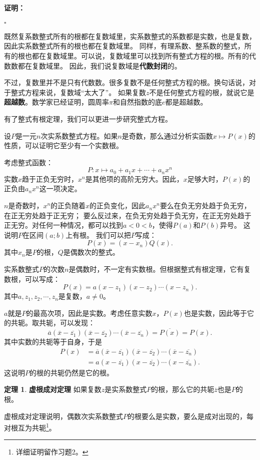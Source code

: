 \documentclass[12pt,UTF8]{ctexbook}
\theoremstyle{definition}
\newtheorem{tm}{定理}[section]
\theoremstyle{plain}
\renewenvironment{proof}{\paragraph{\textbf{证明：}}}{\hfill$\square$}
\begin{document}
\begin{appendix}
\begin{proof}
\end{proof}

既然复系数整式所有的根都在复数域里，实系数整式的系数都是实数，也是复数，因此实系数整式所有的根也都在复数域里。
同样，有理系数、整系数的整式，所有的根也都在复数域里。可以说，复数域里可以找到所有整式方程的根。所有的代数数都在复数域里。
因此，我们说复数域是\textbf{代数封闭}的。

不过，复数里并不是只有代数数。很多复数不是任何整式方程的根。换句话说，对于整式方程来说，复数域“太大了”。
如果复数$z$不是任何整式方程的根，就说它是\textbf{超越数}。数学家已经证明，圆周率$\pi$和自然指数的底$e$都是超越数。

有了整式有根定理，我们可以更进一步研究整式方程。

设$P$是一元$n$次实系数整式方程。如果$n$是奇数，那么通过分析实函数$x\mapsto P(x)$的性质，可以证明它至少有一个实数根。

考虑整式函数：
$$P: x\mapsto a_0 + a_1 x + \cdots + a_n x^n$$
实数$x$趋于正负无穷时，$x^n$是其他项的高阶无穷大。因此，$x$足够大时，$P(x)$的正负由$a_nx^n$这一项决定。

$n$是奇数时，$x^n$的正负随着$x$的正负变化，因此$a_nx^n$要么在负无穷处趋于负无穷，在正无穷处趋于正无穷；
要么反过来，在负无穷处趋于负无穷，在正无穷处趋于正无穷。对任何一种情况，都可以找到$a<0<b$，使得$P(a)$和$P(b)$异号。
这说明$P$在区间$(a;b)$上有根。
我们可以把$P$写成：
$$ P(x) = (x - x_n)Q(x).$$
其中$x_n$是$P$的根，$Q$是偶数次的整式。

实系数整式$P$的次数$n$是偶数时，不一定有实数根。但根据整式有根定理，它有复数根，可以写成：
$$ P(x) = a(x - z_1)(x - z_2)\cdots(x - z_n).$$
其中$a, z_1, z_2,\cdots, z_n$是复数，$a\neq 0$。

$a$就是$P$的最高次项，因此是实数。考虑任意实数$x$，$P(x)$也是实数，因此等于它的共轭。取共轭，可以发现：
$$ \overline{a}(\overline{x} - \overline{z_1})(\overline{x} - \overline{z_2})\cdots(\overline{x} - \overline{z_n}) = \overline{P(x)} = P(x).$$
其中实数的共轭等于自身，于是
\begin{align*}
    P(x) &= \overline{a}(\overline{x} - \overline{z_1})(\overline{x} - \overline{z_2})\cdots(\overline{x} - \overline{z_n}) \\
    &= a(x - \overline{z_1})(x - \overline{z_2})\cdots(x - \overline{z_n}). 
\end{align*}
这说明$P$的根的共轭仍然是它的根。
\begin{tm}{\textbf{虚根成对定理}}
    如果复数$z$是实系数整式$P$的根，那么它的共轭$\overline{z}$也是$P$的根。
\end{tm}
虚根成对定理说明，偶数次实系数整式$P$的根要么是实数，要么是成对出现的，每对根互为共轭\footnote{详细证明留作习题2。}。
  

\end{appendix}
\end{document}
